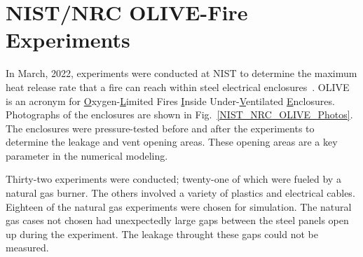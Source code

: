 \FloatBarrier

\section{NIST/NRC OLIVE-Fire Experiments}
\label{NIST_NRC_OLIVE-Fire_Description}

In March, 2022, experiments were conducted at NIST to determine the maximum heat release rate that a fire can reach within steel electrical enclosures~\cite{OLIVE-Fire:2022}. OLIVE is an acronym for \underline{O}xygen-\underline{L}imited Fires \underline{I}nside Under-\underline{V}entilated \underline{E}nclosures. Photographs of the enclosures are shown in Fig.~\ref{NIST_NRC_OLIVE_Photos}. The enclosures were pressure-tested before and after the experiments to determine the leakage and vent opening areas. These opening areas are a key parameter in the numerical modeling.

Thirty-two experiments were conducted; twenty-one of which were fueled by a natural gas burner. The others involved a variety of plastics and electrical cables. Eighteen of the natural gas experiments were chosen for simulation. The natural gas cases not chosen had unexpectedly large gaps between the steel panels open up during the experiment. The leakage throught these gaps could not be measured.

